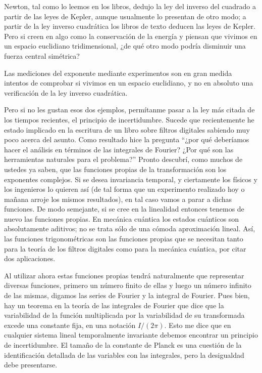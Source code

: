 \documentclass[a4paper, 12pt]{article}
\begin{document}
Newton, tal como lo leemos en los libros, dedujo la ley del inverso del cuadrado a partir de las leyes de Kepler, aunque usualmente lo presentan de otro modo; a partir de la ley inverso cuadrática los libros de texto deducen las leyes de Kepler. Pero si creen en algo como la conservación de la energía y piensan que vivimos en un espacio euclidiano tridimensional, ¿de qué otro modo podría disminuir una fuerza central simétrica?

 

Las mediciones del exponente mediante experimentos son en gran medida intentos de comprobar si vivimos en un espacio euclidiano, y no en absoluto una verificación de la ley inverso cuadrática.

 

Pero si no les gustan esos dos ejemplos, permítanme pasar a la ley más citada de los tiempos recientes, el principio de incertidumbre. Sucede que recientemente he estado implicado en la escritura de un libro sobre filtros digitales  sabiendo muy poco acerca del asunto. Como resultado hice la pregunta ``¿por qué deberíamos hacer el análisis en términos de las integrales de Fourier? ¿Por qué son las herramientas naturales para el problema?'' Pronto descubrí, como muchos de ustedes ya saben, que las funciones propias de la transformación son los exponentes complejos. Si se desea invariancia temporal, y ciertamente los físicos y los ingenieros lo quieren así (de tal forma que un experimento realizado hoy o mañana arroje los mismos resultados), en tal caso vamos a parar a dichas funciones. De modo semejante, si se cree en la linealidad entonces tenemos de nuevo las funciones propias. En mecánica cuántica los estados cuánticos son absolutamente aditivos; no se trata sólo de una cómoda aproximación lineal. Así, las funciones trigonométricas son las funciones propias que se necesitan tanto para la teoría de los filtros digitales como para la mecánica cuántica, por citar dos aplicaciones.

Al utilizar ahora estas funciones propias tendrá naturalmente que representar diversas funciones, primero un número finito de ellas y luego un número infinito de las mismas, digamos las series de Fourier y la integral de Fourier. Pues bien, hay un teorema en la teoría de las integrales de Fourier que dice que la variabilidad de la función multiplicada por la variabilidad de su transformada excede una constante fija, en una notación $I/(2 \pi)$. Esto me dice que en cualquier sistema lineal temporalmente invariante debemos encontrar un principio de incertidumbre. El tamaño de la constante de Planck es una cuestión de la identificación detallada de las variables con las integrales, pero la desigualdad debe presentarse.
\end{document}
